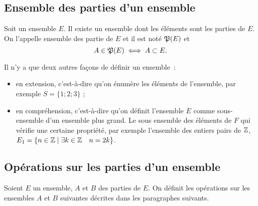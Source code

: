 \subsection{Ensemble des parties d'un ensemble}
\label{chap3-subsec:ensembledesparties}
\begin{axiome}
  Soit un ensemble \(E\). Il existe un ensemble dont les éléments sont les parties de \(E\). On l'appelle ensemble des partie de \(E\) et il est noté \(\mathfrak{P}(E)\) et
\begin{equation}
  A \in \mathfrak{P}(E) \iff A \subset E.
\end{equation}
\end{axiome}
Il n'y a que deux autres façons de définir un ensemble~:
\begin{itemize}
\item en extension, c'est-à-dire qu'on énumère les éléments de l'ensemble, par exemple \(S=\{1;2;3\}\) ;
\item en compréhension, c'est-à-dire qu'on définit l'ensemble \(E\) comme sous-ensemble d'un ensemble plus grand. Le sous ensemble des éléments de \(F\) qui vérifie une certaine propriété, par exemple l'ensemble des entiers pairs de \(\mathbb{Z}\), \(E_1=\left\{n\in\mathbb{Z}\mathrel{}\middle|\mathrel{}\exists k \in \mathbb{Z} \quad n=2k\right\}\).
\end{itemize}
%
\subsection{Opérations sur les parties d'un ensemble}
\label{chap3-subsec:operationparties}
Soient \(E\) un ensemble, \(A\) et \(B\) des parties de \(E\). On définit les opérations sur les ensembles \(A\) et \(B\) suivantes
décrites dans les paragraphes suivants.
%
